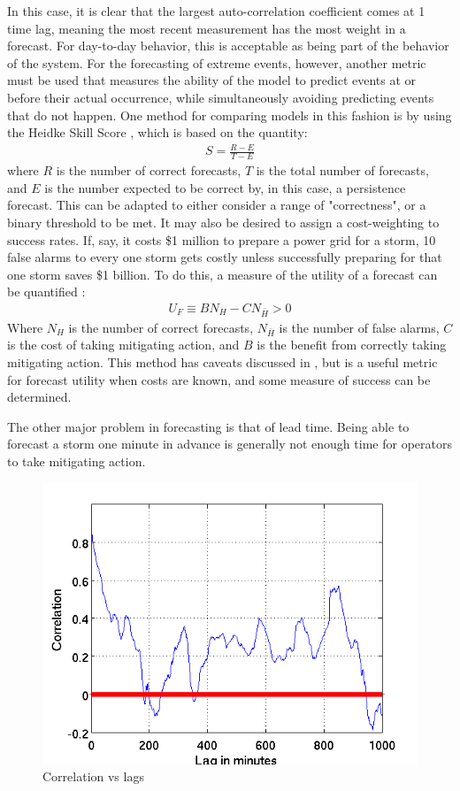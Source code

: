 \documentclass[10pt]{article}
\begin{document}
In this case, it is clear that the largest auto-correlation coefficient comes at 1 time lag, meaning the most recent measurement has the most weight in a forecast. For day-to-day behavior, this is acceptable as being part of the behavior of the system. For the forecasting of extreme events, however, another metric must be used that measures the ability of the model to predict events at or before their actual occurrence, while simultaneously avoiding predicting events that do not happen. One method for comparing models in this fashion is by using the Heidke Skill Score \citep{Heidke,Brier}, which is based on the quantity:
\begin{align*}
S=\frac{R-E}{T-E}
\end{align*}
where $R$ is the number of correct forecasts, $T$ is the total number of forecasts, and $E$ is the number expected to be correct by, in this case, a persistence forecast. This can be adapted to either consider a range of "correctness", or a binary threshold to be met. It may also be desired to assign a cost-weighting to success rates. If, say, it costs \$1 million to prepare a power grid for a storm, 10 false alarms to every one storm gets costly unless successfully preparing for that one storm saves \$1 billion. To do this, a measure of the utility of a forecast can be quantified \citep{WeigelDecision}:
\begin{align*}
U_F\equiv BN_H-CN_{\bar{H}}>0
\end{align*}
Where $N_H$ is the number of correct forecasts, $N_{\bar{H}}$ is the number of false alarms, $C$ is the cost of taking mitigating action, and $B$ is the benefit from correctly taking mitigating action. This method has caveats discussed in \citep{WeigelDecision}, but is a useful metric for forecast utility when costs are known, and some measure of success can be determined. 

The other major problem in forecasting is that of lead time. Being able to forecast a storm one minute in advance is generally not enough time for operators to take mitigating action.

\begin{figure}[h!]
\centering
\includegraphics[scale=0.50]{GIClags.png}
\caption{Correlation vs lags}
\label{Lags}
\end{figure}
\end{document}
